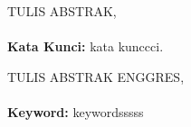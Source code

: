 \documentclass{skripsistatugm}
\begin{document}


\begin{abstractind}
TULIS ABSTRAK,\\
\\
\textbf{Kata Kunci:} kata kunccci.
\end{abstractind}

\begin{abstracteng}
TULIS ABSTRAK ENGGRES,\\
\\
\textbf{Keyword:} keywordsssss

\end{abstracteng}






\end{document}
